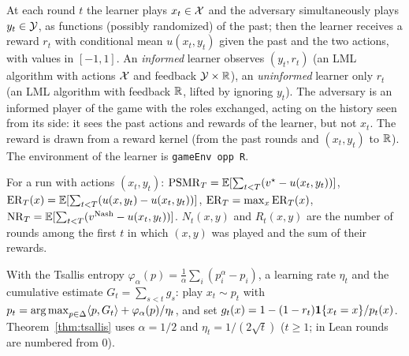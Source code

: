 \begin{definition}
  \label{def:repeated_game}
  \leanok
  At each round $t$ the learner plays $x_t \in \mathcal{X}$ and the adversary simultaneously plays
  $y_t \in \mathcal{Y}$, as functions (possibly randomized) of the past; then the learner receives a reward
  $r_t$ with conditional mean $u(x_t, y_t)$ given the past and the two actions, with values in
  $[-1, 1]$. An \emph{informed} learner observes $(y_t, r_t)$ (an LML algorithm with actions $\mathcal{X}$
  and feedback $\mathcal{Y} \times \mathbb{R}$), an \emph{uninformed} learner only $r_t$ (an LML algorithm with
  feedback $\mathbb{R}$, lifted by ignoring $y_t$). The adversary is an informed player of the game with
  the roles exchanged, acting on the history seen from its side: it sees the past actions and
  rewards of the learner, but not $x_t$. The reward is drawn from a reward kernel (from the past
  rounds and $(x_t, y_t)$ to $\mathbb{R}$). The environment of the learner is \texttt{gameEnv opp R}.
\end{definition}

\begin{definition}[Regrets]
  \label{def:regrets}
  \leanok
  For a run with actions $(x_t, y_t)$: $\mathrm{PSMR}_T = \mathbb{E}[\sum_{t < T} (v^\star - u(x_t, y_t))]$,
  $\mathrm{ER}_T(x) = \mathbb{E}[\sum_{t < T} (u(x, y_t) - u(x_t, y_t))]$, $\mathrm{ER}_T = \max_x \mathrm{ER}_T(x)$,
  $\mathrm{NR}_T = \mathbb{E}[\sum_{t < T} (v^{\mathrm{Nash}} - u(x_t, y_t))]$. $N_t(x, y)$ and $R_t(x, y)$ are the number of
  rounds among the first $t$ in which $(x, y)$ was played and the sum of their rewards.
\end{definition}

\begin{definition}
  \label{def:tsallis_inf}
  \leanok
  With the Tsallis entropy $\varphi_\alpha(p) = \frac1\alpha \sum_i (p_i^\alpha - p_i)$, a learning
  rate $\eta_t$ and the cumulative estimate $G_t = \sum_{s < t} g_s$: play $x_t \sim p_t$ with
  $p_t = \operatorname*{arg\,max}_{p \in \Delta} \langle p, G_t\rangle + \varphi_\alpha(p)/\eta_t$, and set
  $g_t(x) = 1 - (1 - r_t)\mathbf{1}\{x_t = x\}/p_t(x)$. Theorem~\ref{thm:tsallis} uses $\alpha = 1/2$
  and $\eta_t = 1/(2\sqrt t)$ ($t \ge 1$; in Lean rounds are numbered from $0$).
\end{definition}

